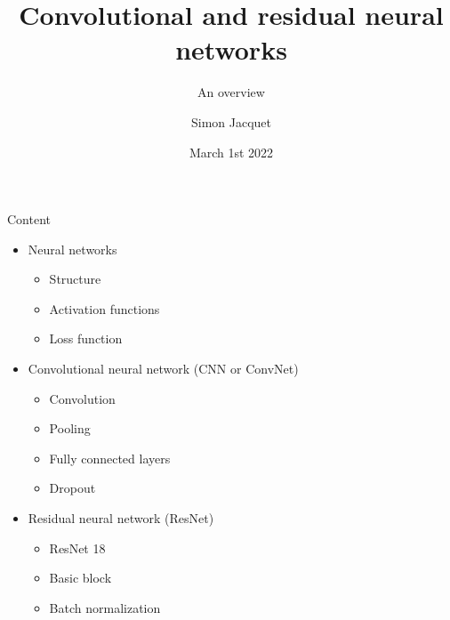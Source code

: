 \documentclass{beamer}
\title[CNN, ResNet]{Convolutional and residual neural networks}
\subtitle{An overview}
\author{Simon Jacquet}
\institute[Unamur]{Faculty of Computer Science\\Unamur}
\date{March 1st 2022}
\begin{document}
\maketitle

\begin{frame}{Content}

\vfill
\begin{itemize}
    \item Neural networks
    \begin{itemize}
        \item Structure
        \item Activation functions
        \item Loss function
    \end{itemize}
    \vfill
    \item Convolutional neural network (CNN or ConvNet)
    \begin{itemize}
        \item Convolution
        \item Pooling
        \item Fully connected layers
        \item Dropout
    \end{itemize}
    \vfill
    \item Residual neural network (ResNet)
    \begin{itemize}
        \item ResNet 18
        \item Basic block
        \item Batch normalization
    \end{itemize}
\end{itemize}
\vfill
    
\end{frame}
\end{document}
